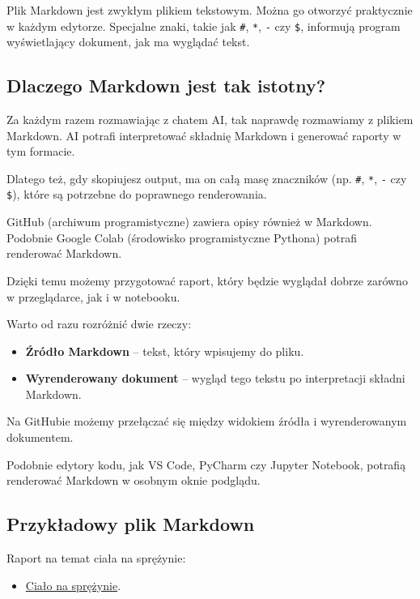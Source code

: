 \documentclass[12pt,a4paper]{article}
\begin{document}
Plik Markdown jest zwykłym plikiem tekstowym. Można go otworzyć praktycznie w każdym edytorze. Specjalne znaki, takie jak \texttt{\#}, \texttt{*}, \texttt{-} czy \texttt{\$}, informują program wyświetlający dokument, jak ma wyglądać tekst.

\subsection{Dlaczego Markdown jest tak istotny?}

Za każdym razem rozmawiając z chatem AI, tak naprawdę rozmawiamy z plikiem Markdown. AI potrafi interpretować składnię Markdown i generować raporty w tym formacie.

Dlatego też, gdy skopiujesz output, ma on całą masę znaczników (np. \texttt{\#}, \texttt{*}, \texttt{-} czy \texttt{\$}), które są potrzebne do poprawnego renderowania.

GitHub (archiwum programistyczne) zawiera opisy również w Markdown. Podobnie Google Colab (środowisko programistyczne Pythona) potrafi renderować Markdown.

Dzięki temu możemy przygotować raport, który będzie wyglądał dobrze zarówno w przeglądarce, jak i w notebooku.

Warto od razu rozróżnić dwie rzeczy:

\begin{itemize}
    \item \textbf{Źródło Markdown} -- tekst, który wpisujemy do pliku.
    \item \textbf{Wyrenderowany dokument} -- wygląd tego tekstu po interpretacji składni Markdown.
\end{itemize}

Na GitHubie możemy przełączać się między widokiem źródła i wyrenderowanym dokumentem.

Podobnie edytory kodu, jak VS Code, PyCharm czy Jupyter Notebook, potrafią renderować Markdown w osobnym oknie podglądu.

\subsection{Przykładowy plik Markdown}

Raport na temat ciała na sprężynie:

\begin{itemize}
    \item \href{examples/01_markdown/raport_cialo_na_sprezynie.md}
    {Ciało na sprężynie}.
\end{itemize}
\end{document}
